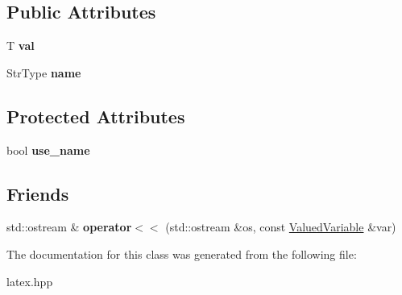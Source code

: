\subsection*{Public Attributes}
\begin{DoxyCompactItemize}
\item 
\hypertarget{classlatex_1_1math_1_1ValuedVariable_aad84e39391316c36825af042992ac225}{T {\bfseries val}}\label{classlatex_1_1math_1_1ValuedVariable_aad84e39391316c36825af042992ac225}

\item 
\hypertarget{classlatex_1_1math_1_1ValuedVariable_a3a264740a41049cc02f6a4f50d1279af}{Str\-Type {\bfseries name}}\label{classlatex_1_1math_1_1ValuedVariable_a3a264740a41049cc02f6a4f50d1279af}

\end{DoxyCompactItemize}
\subsection*{Protected Attributes}
\begin{DoxyCompactItemize}
\item 
\hypertarget{classlatex_1_1math_1_1ValuedVariable_a96abea7cceefbe528070cd2b9ee9706a}{bool {\bfseries use\-\_\-name}}\label{classlatex_1_1math_1_1ValuedVariable_a96abea7cceefbe528070cd2b9ee9706a}

\end{DoxyCompactItemize}
\subsection*{Friends}
\begin{DoxyCompactItemize}
\item 
\hypertarget{classlatex_1_1math_1_1ValuedVariable_a1091332fb959f33e8cf6cb07273c508b}{std\-::ostream \& {\bfseries operator$<$$<$} (std\-::ostream \&os, const \hyperlink{classlatex_1_1math_1_1ValuedVariable}{Valued\-Variable} \&var)}\label{classlatex_1_1math_1_1ValuedVariable_a1091332fb959f33e8cf6cb07273c508b}

\end{DoxyCompactItemize}


The documentation for this class was generated from the following file\-:\begin{DoxyCompactItemize}
\item 
latex.\-hpp\end{DoxyCompactItemize}

